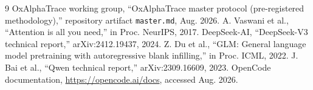 \documentclass[conference]{IEEEtran}
\begin{document}
\begin{thebibliography}{9}
 OxAlphaTrace working group, ``OxAlphaTrace master protocol (pre-registered methodology),'' repository artifact \texttt{master.md}, Aug. 2026.
 A. Vaswani et al., ``Attention is all you need,'' in Proc. NeurIPS, 2017.
 DeepSeek-AI, ``DeepSeek-V3 technical report,'' arXiv:2412.19437, 2024.
 Z. Du et al., ``GLM: General language model pretraining with autoregressive blank infilling,'' in Proc. ICML, 2022.
 J. Bai et al., ``Qwen technical report,'' arXiv:2309.16609, 2023.
 OpenCode documentation, \url{https://opencode.ai/docs}, accessed Aug. 2026.
\end{thebibliography}
\end{document}
